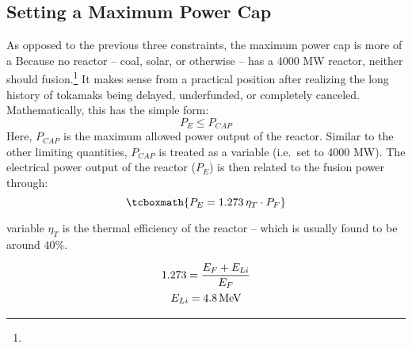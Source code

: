 \subsection{Setting a Maximum Power Cap}

As opposed to the previous three  constraints, the maximum power cap is more of a  Because no reactor -- coal, solar, or otherwise -- has a 4000 MW reactor, neither should fusion.\footnote{} It makes sense from a practical position after realizing the long history of tokamaks being delayed, underfunded, or completely canceled. Mathematically, this has the simple form:
\begin{equation}
	P_E \le P_{CAP}
\end{equation}
Here, $P_{CAP}$ is the maximum allowed power output of the reactor. Similar to the other limiting quantities, $P_{CAP}$ is treated as a  variable (i.e.\ set to 4000 MW). The electrical power output of the reactor ($P_E$) is then related to the fusion power through: \cite{jeff}
\begin{equation}
	\tcboxmath{
	P_E = 1.273 \, \eta_T \cdot P_F
	}
\end{equation}

 variable $\eta_T$ is the thermal efficiency of the reactor -- which is usually found to be around 40\%. 

\begin{gather}
	1.273 = \frac{ E_F + E_{Li} }{ E_F } \\
	E_{Li} = 4.8 \, \textnormal{MeV}
\end{gather}

